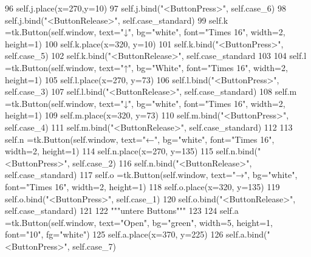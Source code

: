 \begin{DoxyCode}
96         self.j.place(x=270,y=10) 
97         self.j.bind(\textcolor{stringliteral}{"<ButtonPress>"}, self.case\_6)
98         self.j.bind(\textcolor{stringliteral}{"<ButtonRelease>"}, self.case\_standard)
99         self.k =tk.Button(self.window, text=\textcolor{stringliteral}{"↓"}, bg=\textcolor{stringliteral}{"white"}, font=\textcolor{stringliteral}{"Times 16"}, width=2, height=1)
100         self.k.place(x=320, y=10)
101         self.k.bind(\textcolor{stringliteral}{"<ButtonPress>"}, self.case\_5)
102         self.k.bind(\textcolor{stringliteral}{"<ButtonRelease>"}, self.case\_standard
103 
104         self.l =tk.Button(self.window, text=\textcolor{stringliteral}{"↑"}, bg=\textcolor{stringliteral}{"White"}, font=\textcolor{stringliteral}{"Times 16"}, width=2, height=1)
105         self.l.place(x=270, y=73)
106         self.l.bind(\textcolor{stringliteral}{"<ButtonPress>"}, self.case\_3)
107         self.l.bind(\textcolor{stringliteral}{"<ButtonRelease>"}, self.case\_standard)
108         self.m =tk.Button(self.window, text=\textcolor{stringliteral}{"↓"}, bg=\textcolor{stringliteral}{"white"}, font=\textcolor{stringliteral}{"Times 16"}, width=2, height=1)
109         self.m.place(x=320, y=73)
110         self.m.bind(\textcolor{stringliteral}{"<ButtonPress>"}, self.case\_4)
111         self.m.bind(\textcolor{stringliteral}{"<ButtonRelease>"}, self.case\_standard) 
112 
113         self.n =tk.Button(self.window, text=\textcolor{stringliteral}{"←"}, bg=\textcolor{stringliteral}{"white"}, font=\textcolor{stringliteral}{"Times 16"}, width=2, height=1)
114         self.n.place(x=270, y=135)
115         self.n.bind(\textcolor{stringliteral}{"<ButtonPress>"}, self.case\_2)
116         self.n.bind(\textcolor{stringliteral}{"<ButtonRelease>"}, self.case\_standard)
117         self.o =tk.Button(self.window, text=\textcolor{stringliteral}{"→"}, bg=\textcolor{stringliteral}{"white"}, font=\textcolor{stringliteral}{"Times 16"}, width=2, height=1)
118         self.o.place(x=320, y=135)
119         self.o.bind(\textcolor{stringliteral}{"<ButtonPress>"}, self.case\_1)
120         self.o.bind(\textcolor{stringliteral}{"<ButtonRelease>"}, self.case\_standard)
121 
122         \textcolor{stringliteral}{"""untere Buttons"""}
123         
124         self.a =tk.Button(self.window, text=\textcolor{stringliteral}{"Open"}, bg=\textcolor{stringliteral}{"green"}, width=5, height=1, font=\textcolor{stringliteral}{"10"}, fg=\textcolor{stringliteral}{"white"})
125         self.a.place(x=370, y=225)
126         self.a.bind(\textcolor{stringliteral}{"<ButtonPress>"}, self.case\_7)

\end{DoxyCode}
